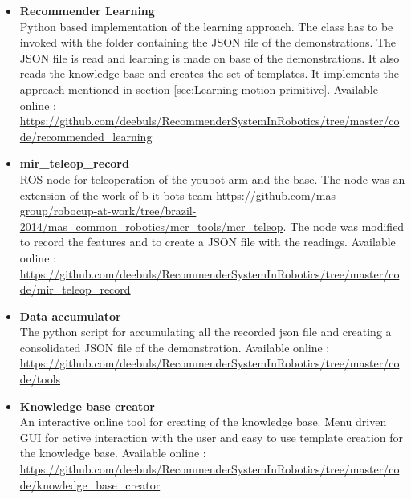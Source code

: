 \begin{itemize}

    \item \textbf{Recommender Learning} \\
        Python based implementation of the learning approach. The class has to be 
        invoked with the folder containing the JSON file of the demonstrations.
        The JSON file is read and learning is made on base of the demonstrations.
        It also reads the knowledge base and creates the set of templates.
        It implements the approach mentioned in section \ref{sec:Learning motion primitive}.
        Available online : \url{https://github.com/deebuls/RecommenderSystemInRobotics/tree/master/code/recommended\_learning}

    \item \textbf{mir\_teleop\_record} \\
        ROS node for teleoperation of the youbot arm and the base. The node was 
        an extension of the work of b-it bots team \url{https://github.com/mas-group/robocup-at-work/tree/brazil-2014/mas\_common\_robotics/mcr\_tools/mcr\_teleop}.
        The node was modified to record the features and to create a JSON file with the readings.
        Available online : \url {https://github.com/deebuls/RecommenderSystemInRobotics/tree/master/code/mir\_teleop\_record }

    \item \textbf{Data accumulator} \\
        The python script for accumulating all the recorded json file and creating
        a consolidated JSON file of the demonstration.
        Available online : \url{https://github.com/deebuls/RecommenderSystemInRobotics/tree/master/code/tools }

    \item \textbf{Knowledge base creator} \\
        An interactive online tool for creating of the knowledge base.
        Menu driven GUI for active interaction with the user and easy to use
        template creation for the knowledge base.
        Available online : \url{ https://github.com/deebuls/RecommenderSystemInRobotics/tree/master/code/knowledge\_base\_creator}

\end{itemize}
